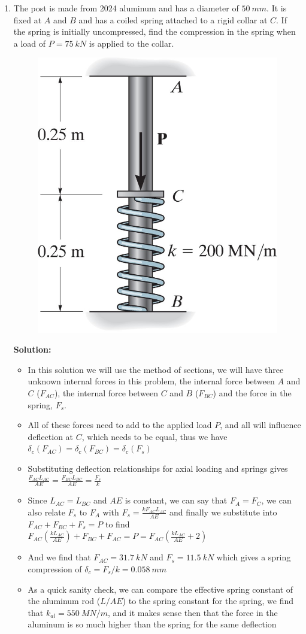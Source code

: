 \documentclass[12pt, oneside]{article}
\begin{document}
\begin{enumerate}
	\item %
		The post is made from 2024 aluminum and has a diameter of $\SI{50}{mm}$.
		It is fixed at $A$ and $B$ and has a coiled spring attached to a rigid collar at $C$.
		If the spring is initially uncompressed, find the compression in the spring when a load of $P = \SI{75}{kN}$ is applied to the collar.
		\begin{figure}[H]
			\centering
			\includegraphics[width=0.45\linewidth]{4-59}
		\end{figure}
		\textbf{Solution:}
		\begin{itemize}
			\item In this solution we will use the method of sections, we will have three unknown internal forces in this problem, the internal force between $A$ and $C$ ($F_{AC}$), the internal force between $C$ and $B$ ($F_{BC}$) and the force in the spring, $F_s$.
			\item All of these forces need to add to the applied load $P$, and all will influence deflection at $C$, which needs to be equal, thus we have $\delta_c (F_{AC}) = \delta_c (F_{BC}) = \delta_c (F_s)$
			\item Substituting deflection relationships for axial loading and springs gives $ \frac{F_{AC} L_{AC}}{AE} = \frac{F_{BC}L_{BC}}{AE} = \frac{F_s}{k} $
      \item Since $L_{AC} = L_{BC}$ and $AE$ is constant, we can say that $F_A = F_C$, we can also relate $F_s$ to $F_A$ with $F_s = \frac{kF_{AC} L_{AC}}{AE}$ and finally we substitute into $F_{AC} + F_{BC} + F_s = P$ to find $ F_{AC}\left( \frac{k L_{AC}}{AE} \right) + F_{BC} + F_{AC} = P = F_{AC}\left(\frac{k L_{AC}}{AE} + 2 \right)$
			\item And we find that $F_{AC} = \SI{31.7}{kN}$ and $F_s = \SI{11.5}{kN}$ which gives a spring compression of $ \delta_c = F_s / k = \SI{0.058}{mm} $
			\item As a quick sanity check, we can compare the effective spring constant of the aluminum rod ($L/AE$) to the spring constant for the spring, we find that $k_{al} = \SI{550}{MN/m}$, and it makes sense then that the force in the aluminum is so much higher than the spring for the same deflection
		\end{itemize}


\end{enumerate}
\end{document}

